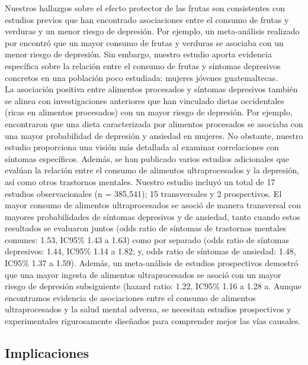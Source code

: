 \documentclass[man]{apa7}
\begin{document}
	Nuestros hallazgos sobre el efecto protector de las frutas son
	consistentes con estudios previos que han encontrado asociaciones entre
	el consumo de frutas y verduras y un menor riesgo de depresión. Por
	ejemplo, un meta-análisis realizado por \parencite{liuFruitVegetableConsumption2016} encontró que
	un mayor consumo de frutas y verduras se asociaba con un menor riesgo de
	depresión. Sin embargo, nuestro estudio aporta evidencia específica
	sobre la relación entre el consumo de frutas y síntomas depresivos
	concretos en una población poco estudiada: mujeres jóvenes
	guatemaltecas.\\

	La asociación positiva entre alimentos procesados y síntomas depresivos también se alinea con investigaciones anteriores que han vinculado dietas occidentales (ricas en alimentos procesados) con un mayor riesgo de depresión. Por ejemplo, \parencite{laneUltraProcessedFoodConsumption2022} encontraron que una dieta caracterizada por alimentos procesados se asociaba con una mayor probabilidad de depresión y ansiedad en mujeres. No obstante, nuestro estudio proporciona una visión más detallada al examinar correlaciones con síntomas específicos. Además, se han publicado varios estudios adicionales que evalúan la relación entre el consumo de alimentos ultraprocesados y la depresión, así como otros trastornos mentales. Nuestro estudio incluyó un total de 17 estudios observacionales (n = 385,541); 15 transversales y 2 prospectivos. El mayor consumo de alimentos ultraprocesados se asoció de manera transversal con mayores probabilidades de síntomas depresivos y de ansiedad, tanto cuando estos resultados se evaluaron juntos (odds ratio de síntomas de trastornos mentales comunes: 1.53, IC95\% 1.43 a 1.63) como por separado (odds ratio de síntomas depresivos: 1.44, IC95\% 1.14 a 1.82; y, odds ratio de síntomas de ansiedad: 1.48, IC95\% 1.37 a 1.59). Además, un meta-análisis de estudios prospectivos demostró que una mayor ingesta de alimentos ultraprocesados se asoció con un mayor riesgo de depresión subsiguiente (hazard ratio: 1.22, IC95\% 1.16 a 1.28 a. Aunque encontramos evidencia de asociaciones entre el consumo de alimentos ultraprocesados y la salud mental adversa, se necesitan estudios prospectivos y experimentales rigurosamente diseñados para comprender mejor las vías causales.

	\subsection{Implicaciones}\label{implicaciones}
\end{document}
